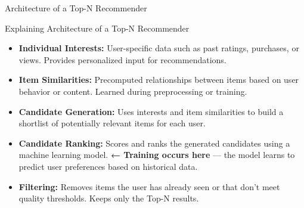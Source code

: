 \documentclass{beamer}
\begin{document}
\begin{frame}{Architecture of a Top-N Recommender}
\begin{center}
\end{center}
\end{frame}

\begin{frame}{Explaining Architecture of a Top-N Recommender}
\begin{itemize}
    \item \textbf{Individual Interests:}  
    User-specific data such as past ratings, purchases, or views. Provides personalized input for recommendations.

    \item \textbf{Item Similarities:}  
    Precomputed relationships between items based on user behavior or content. Learned during preprocessing or training.

    \item \textbf{Candidate Generation:}  
    Uses interests and item similarities to build a shortlist of potentially relevant items for each user.

    \item \textbf{Candidate Ranking:}  
    Scores and ranks the generated candidates using a machine learning model.  
    \textbf{← Training occurs here} — the model learns to predict user preferences based on historical data.

    \item \textbf{Filtering:}  
    Removes items the user has already seen or that don’t meet quality thresholds. Keeps only the Top-N results.
\end{itemize}
\end{frame}
\end{document}
